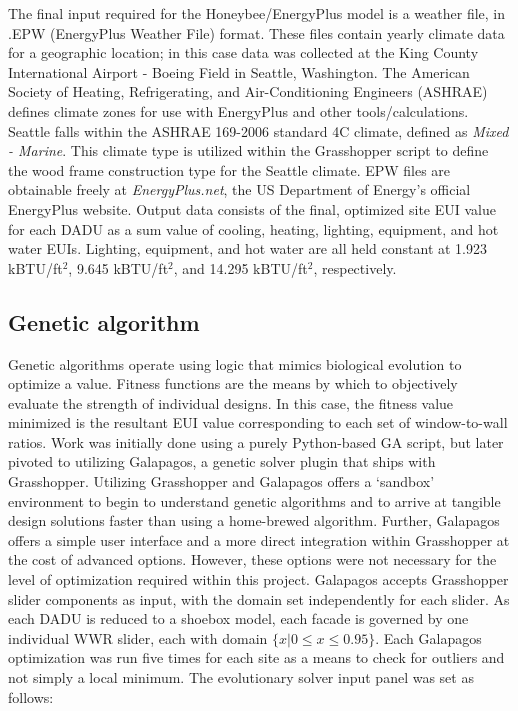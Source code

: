 \documentclass[sagev,times,Review,doublespace]{sagej}
\begin{document}
The final input required for the Honeybee/EnergyPlus model is a weather file, in .EPW (EnergyPlus Weather File) format. These files contain yearly climate data for a geographic location; in this case data was collected at the King County International Airport - Boeing Field in Seattle, Washington. The American Society of Heating, Refrigerating, and Air-Conditioning Engineers (ASHRAE) defines climate zones for use with EnergyPlus and other tools/calculations. Seattle falls within the ASHRAE 169-2006 standard 4C climate, defined as \textit{Mixed - Marine}. This climate type is utilized within the Grasshopper script to define the wood frame construction type for the Seattle climate. EPW files are obtainable freely at \textit{EnergyPlus.net}, the US Department of Energy's official EnergyPlus website. Output data consists of the final, optimized site EUI value for each DADU as a sum value of cooling, heating, lighting, equipment, and hot water EUIs. Lighting, equipment, and hot water are all held constant at 1.923 kBTU/ft$^2$, 9.645 kBTU/ft$^2$, and 14.295 kBTU/ft$^2$, respectively. 

\subsection{Genetic algorithm}
Genetic algorithms operate using logic that mimics biological evolution to optimize a value. Fitness functions are the means by which to objectively evaluate the strength of individual designs. In this case, the fitness value minimized is the resultant EUI value corresponding to each set of window-to-wall ratios. Work was initially done using a purely Python-based GA script, but later pivoted to utilizing Galapagos, a genetic solver plugin that ships with Grasshopper. Utilizing Grasshopper and Galapagos offers a ‘sandbox’ environment to begin to understand genetic algorithms and to arrive at tangible design solutions faster than using a home-brewed algorithm. Further, Galapagos offers a simple user interface and a more direct integration within Grasshopper at the cost of advanced options. However, these options were not necessary for the level of optimization required within this project. Galapagos accepts Grasshopper slider components as input, with the domain set independently for each slider. As each DADU is reduced to a shoebox model, each facade is governed by one individual WWR slider, each with domain $\lbrace x \vert 0 \leq x \leq 0.95 \rbrace$. Each Galapagos optimization was run five times for each site as a means to  check for outliers and not simply a local minimum. The evolutionary solver input panel was set as follows: 
\end{document}
